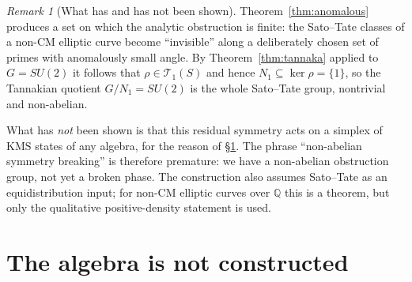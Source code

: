 \documentclass[11pt]{amsart}
\numberwithin{equation}{section}
\theoremstyle{definition}
\theoremstyle{remark}
\newtheorem{remark}[theorem]{Remark}
\newcommand{\Q}{\mathbb{Q}}
\newcommand{\cT}{\mathcal{T}}
\begin{document}
\begin{remark}[What has and has not been shown]\label{rem:anomalouswarn}
Theorem~\ref{thm:anomalous} produces a set on which the analytic obstruction is finite: the
Sato--Tate classes of a non-CM elliptic curve become ``invisible'' along a deliberately
chosen set of primes with anomalously small angle. By Theorem~\ref{thm:tannaka} applied to
$G=SU(2)$ it follows that $\rho\in\cT_1(S)$ and hence $N_1\subseteq\ker\rho=\{1\}$, so the
Tannakian quotient $G/N_1=SU(2)$ is the whole Sato--Tate group, nontrivial and
non-abelian.

What has \emph{not} been shown is that this residual symmetry acts on a simplex of
$\mathrm{KMS}$ states of any algebra, for the reason of \S\ref{sec:algebra}. The phrase
``non-abelian symmetry breaking'' is therefore premature: we have a non-abelian obstruction
group, not yet a broken phase. The construction also assumes Sato--Tate as an
equidistribution input; for non-CM elliptic curves over $\Q$ this is a theorem, but only the
qualitative positive-density statement is used.
\end{remark}

\section{The algebra is not constructed}\label{sec:algebra}
\end{document}
